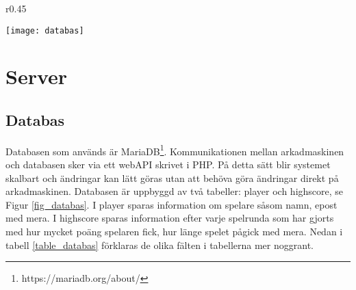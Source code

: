 \documentclass[12pt,fleqn,openany]{book} %
\begin{document}
\begin{wrapfigure}{r}{0.45\textwidth}
  \begin{center}
    \texttt{[image: databas]}
  \end{center}
  \caption{Databastabeller}
  \label{fig_databas}
\end{wrapfigure}

\section{Server}
\subsection{Databas}

Databasen som används är MariaDB\footnote{https://mariadb.org/about/}. Kommunikationen mellan arkadmaskinen och databasen 
sker via ett webAPI skrivet i PHP. På detta sätt blir systemet skalbart och ändringar kan lätt göras utan att behöva göra 
ändringar direkt på arkadmaskinen. Databasen är uppbyggd av två tabeller: player och highscore, se Figur \ref{fig_databas}.
\clearpage
I player sparas information om spelare såsom namn, epost med mera. I highscore sparas information efter varje spelrunda som
har gjorts med hur mycket poäng spelaren fick, hur länge spelet pågick med mera. Nedan i tabell \ref{table_databas} förklaras de olika fälten
i tabellerna mer noggrant.


\begin{table}[!h]
\centering\caption{Förklaring av databastabell}
\label{table_databas}
\end{table}
\end{document}
